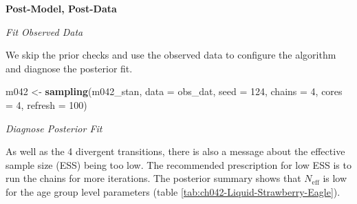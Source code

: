 \documentclass[11pt, oneside, openany]{scrbook}
\newenvironment{Shaded}{\begin{snugshade}}{\end{snugshade}}
\newcommand{\CommentTok}[1]{\textcolor[rgb]{0.56,0.35,0.01}{\textit{#1}}}
\newcommand{\DataTypeTok}[1]{\textcolor[rgb]{0.13,0.29,0.53}{#1}}
\newcommand{\DecValTok}[1]{\textcolor[rgb]{0.00,0.00,0.81}{#1}}
\newcommand{\KeywordTok}[1]{\textcolor[rgb]{0.13,0.29,0.53}{\textbf{#1}}}
\newcommand{\NormalTok}[1]{#1}
\newcommand{\StringTok}[1]{\textcolor[rgb]{0.31,0.60,0.02}{#1}}
\begin{document}
\textbf{Post-Model, Post-Data}

\emph{Fit Observed Data}

We skip the prior checks and use the observed data to configure the algorithm and diagnose the posterior fit.


\begin{Shaded}
\begin{Highlighting}[]
\NormalTok{m042 <-}\StringTok{ }\KeywordTok{sampling}\NormalTok{(m042_stan, }\DataTypeTok{data =}\NormalTok{ obs_dat, }\DataTypeTok{seed =} \DecValTok{124}\NormalTok{,}
                 \DataTypeTok{chains =} \DecValTok{4}\NormalTok{, }\DataTypeTok{cores =} \DecValTok{4}\NormalTok{, }\DataTypeTok{refresh =} \DecValTok{100}\NormalTok{)}
\end{Highlighting}
\end{Shaded}


\emph{Diagnose Posterior Fit}


\begin{Shaded}
\end{Shaded}


As well as the 4 divergent transitions, there is also a message about the effective sample size (ESS) being too low. The recommended prescription for low ESS is to run the chains for more iterations. The posterior summary shows that \(N_{\mathrm{eff}}\) is low for the age group level parameters (table \ref{tab:ch042-Liquid-Strawberry-Eagle}).
\end{document}
